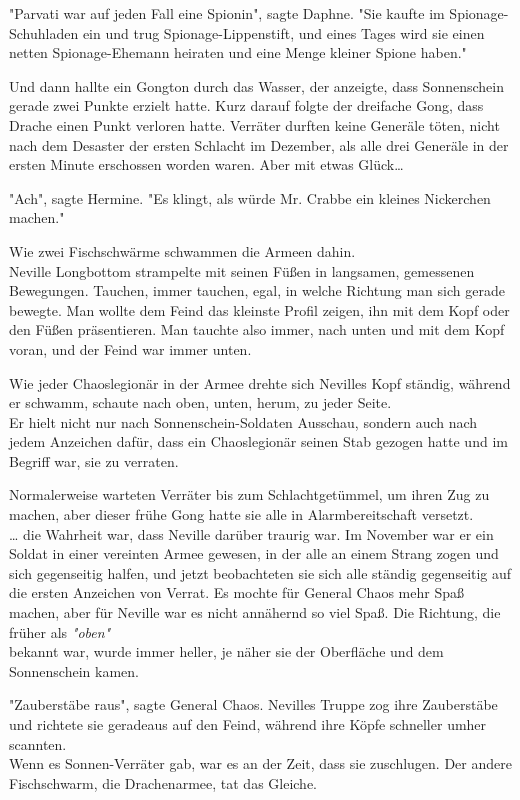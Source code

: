 {"Parvati war auf jeden Fall eine Spionin", sagte Daphne. "Sie kaufte im Spionage-Schuhladen ein und trug Spionage-Lippenstift, und eines Tages wird sie einen netten Spionage-Ehemann heiraten und eine Menge kleiner Spione haben."

Und dann hallte ein Gongton durch das Wasser, der anzeigte, dass Sonnenschein gerade zwei Punkte erzielt hatte. Kurz darauf folgte der dreifache Gong, dass Drache einen Punkt verloren hatte. Verräter durften keine Generäle töten, nicht nach dem Desaster der ersten Schlacht im Dezember, als alle drei Generäle in der ersten Minute erschossen worden waren. Aber mit etwas Glück…

"Ach", sagte Hermine. "Es klingt, als würde Mr. Crabbe ein kleines Nickerchen machen."

Wie zwei Fischschwärme schwammen die Armeen dahin.\\ Neville Longbottom strampelte mit seinen Füßen in langsamen, gemessenen Bewegungen. Tauchen, immer tauchen, egal, in welche Richtung man sich gerade bewegte. Man wollte dem Feind das kleinste Profil zeigen, ihn mit dem Kopf oder den Füßen präsentieren. Man tauchte also immer, nach unten und mit dem Kopf voran, und der Feind war immer unten.

Wie jeder Chaoslegionär in der Armee drehte sich Nevilles Kopf ständig, während er schwamm, schaute nach oben, unten, herum, zu jeder Seite.\\ Er hielt nicht nur nach Sonnenschein-Soldaten Ausschau, sondern auch nach jedem Anzeichen dafür, dass ein Chaoslegionär seinen Stab gezogen hatte und im Begriff war, sie zu verraten.

Normalerweise warteten Verräter bis zum Schlachtgetümmel, um ihren Zug zu machen, aber dieser frühe Gong hatte sie alle in Alarmbereitschaft versetzt.\\ … die Wahrheit war, dass Neville darüber traurig war. Im November war er ein Soldat in einer vereinten Armee gewesen, in der alle an einem Strang zogen und sich gegenseitig halfen, und jetzt beobachteten sie sich alle ständig gegenseitig auf die ersten Anzeichen von Verrat. Es mochte für General Chaos mehr Spaß machen, aber für Neville war es nicht annähernd so viel Spaß. Die Richtung, die früher als \emph{"oben"}\\ bekannt war, wurde immer heller, je näher sie der Oberfläche und dem Sonnenschein kamen.

"Zauberstäbe raus", sagte General Chaos. Nevilles Truppe zog ihre Zauberstäbe und richtete sie geradeaus auf den Feind, während ihre Köpfe schneller umher scannten.\\ Wenn es Sonnen-Verräter gab, war es an der Zeit, dass sie zuschlugen. Der andere Fischschwarm, die Drachenarmee, tat das Gleiche.

}
